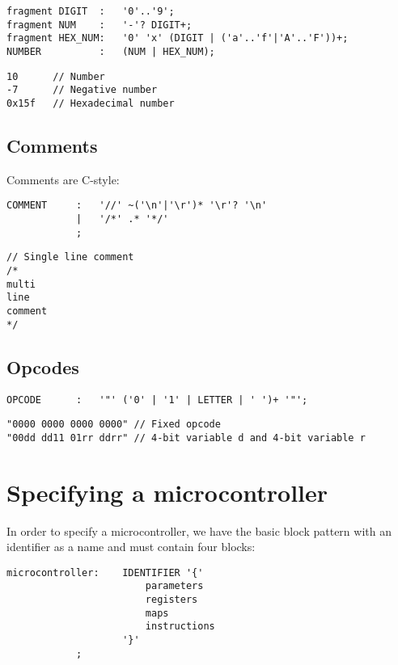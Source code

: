 \lstset{caption=Number specifation}
\begin{lstlisting}
fragment DIGIT	:	'0'..'9';
fragment NUM	:	'-'? DIGIT+;
fragment HEX_NUM:	'0' 'x' (DIGIT | ('a'..'f'|'A'..'F'))+;
NUMBER			:	(NUM | HEX_NUM);
\end{lstlisting}

\lstset{caption=Example numbers}
\begin{lstlisting}
10		// Number
-7		// Negative number
0x15f	// Hexadecimal number
\end{lstlisting}

\subsection{Comments}
Comments are C-style:

\lstset{caption=Comment specifation}
\begin{lstlisting}
COMMENT		:	'//' ~('\n'|'\r')* '\r'? '\n'
			|	'/*' .* '*/'
			;
\end{lstlisting}

\lstset{caption=Example comments}
\begin{lstlisting}
// Single line comment
/*
multi
line
comment
*/
\end{lstlisting}

\subsection{Opcodes}
\lstset{caption=Opcode specifation}
\begin{lstlisting}
OPCODE		:	'"' ('0' | '1' | LETTER | ' ')+ '"';
\end{lstlisting}

\lstset{caption=Example Opcodes}
\begin{lstlisting}
"0000 0000 0000 0000" // Fixed opcode
"00dd dd11 01rr ddrr" // 4-bit variable d and 4-bit variable r
\end{lstlisting}

\section{Specifying a microcontroller}
In order to specify a microcontroller, we have the basic block pattern with an
identifier as a name and must contain four blocks:
\lstset{caption=Microcontroller specification}
\begin{lstlisting}
microcontroller:	IDENTIFIER '{'
						parameters
						registers
						maps
						instructions
					'}'
			;
\end{lstlisting}

